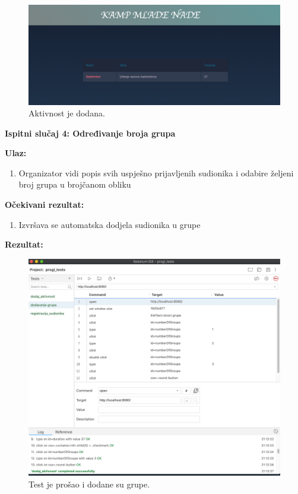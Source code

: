             \begin{figure}[H]
            \includegraphics[scale=0.35]{dokumentacija/slike/DODAVANJE_AKTIVNOSTI.png} %
            \centering
            Aktivnost je dodana.
            \label{fig:promjene}
            \end{figure}
			
			\textbf{}
			\newline
			
			
			\textbf{Ispitni slučaj 4: Određivanje broja grupa}
			
			\textbf{Ulaz:}
			\begin{enumerate}
			    \item Organizator vidi popis svih uspješno prijavljenih sudionika i odabire željeni broj grupa u brojčanom obliku
			\end{enumerate}
			
			\textbf{Očekivani rezultat:}
			
			\begin{enumerate}
			    \item Izvršava se automatska dodjela sudionika u grupe
			\end{enumerate}
			\pagebreak
			\textbf{Rezultat:} 
			\begin{figure}[H]
            \includegraphics[scale=0.45]{dokumentacija/slike/DODAVANJE_GRUPA_TEST.png} %
            \centering
            Test je prošao i dodane su grupe.
            \label{fig:promjene}
            \end{figure}			
			\eject 
		
